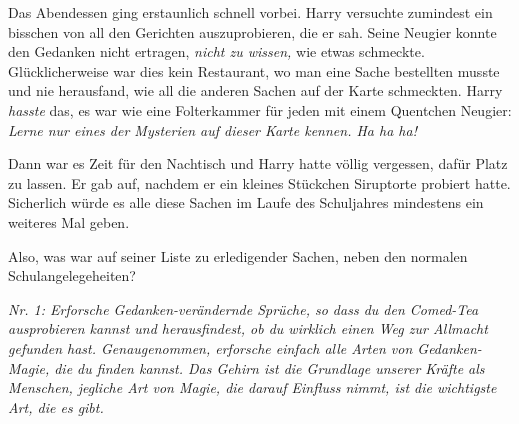 Das Abendessen ging erstaunlich schnell vorbei. Harry versuchte zumindest ein bisschen von all den Gerichten auszuprobieren, die er sah. Seine Neugier konnte den Gedanken nicht ertragen, \emph{nicht zu wissen,} wie etwas schmeckte. Glücklicherweise war dies kein Restaurant, wo man eine Sache bestellten musste und nie herausfand, wie all die anderen Sachen auf der Karte schmeckten. Harry \emph{hasste} das, es war wie eine Folterkammer für jeden mit einem Quentchen Neugier: \emph{Lerne nur eines der Mysterien auf dieser Karte kennen. Ha ha ha!}

Dann war es Zeit für den Nachtisch und Harry hatte völlig vergessen, dafür Platz zu lassen. Er gab auf, nachdem er ein kleines Stückchen Siruptorte probiert hatte. Sicherlich würde es alle diese Sachen im Laufe des Schuljahres mindestens ein weiteres Mal geben.

Also, was war auf seiner Liste zu erledigender Sachen, neben den normalen Schulangelegeheiten?

\emph{Nr. 1: Erforsche Gedanken-verändernde Sprüche, so dass du den Comed-Tea ausprobieren kannst und herausfindest, ob du wirklich einen Weg zur Allmacht gefunden hast. Genaugenommen, erforsche einfach alle Arten von Gedanken-Magie, die du finden kannst. Das Gehirn ist die Grundlage unserer Kräfte als Menschen, jegliche Art von Magie, die darauf Einfluss nimmt, ist die wichtigste Art, die es gibt.}

